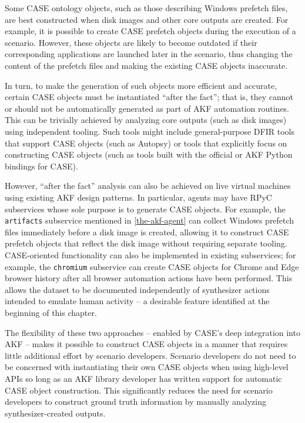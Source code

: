 \documentclass[letterpaper,12pt]{report}
\newcommand{\passthrough}[1]{#1}
\begin{document}
Some CASE ontology objects, such as those describing Windows prefetch
files, are best constructed when disk images and other core outputs are
created. For example, it is possible to create CASE prefetch objects
during the execution of a scenario. However, these objects are likely to
become outdated if their corresponding applications are launched later
in the scenario, thus changing the content of the prefetch files and
making the existing CASE objects inaccurate.

In turn, to make the generation of such objects more efficient and
accurate, certain CASE objects must be instantiated ``after the fact'';
that is, they cannot or should not be automatically generated as part of
AKF automation routines. This can be trivially achieved by analyzing
core outputs (such as disk images) using independent tooling. Such tools
might include general-purpose DFIR tools that support CASE objects (such
as Autopsy) or tools that explicitly focus on constructing CASE objects
(such as tools built with the official or AKF Python bindings for CASE).

However, ``after the fact'' analysis can also be achieved on live
virtual machines using existing AKF design patterns. In particular,
agents may have RPyC subservices whose sole purpose is to generate CASE
objects. For example, the \passthrough{\lstinline!artifacts!} subservice
mentioned in \autoref{the-akf-agent}
can collect Windows prefetch files immediately before a disk image is
created, allowing it to construct CASE prefetch objects that reflect the
disk image without requiring separate tooling. CASE-oriented
functionality can also be implemented in existing subservices; for
example, the \passthrough{\lstinline!chromium!} subservice can create
CASE objects for Chrome and Edge browser history after all browser
automation actions have been performed. This allows the dataset to be
documented independently of synthesizer actions intended to emulate
human activity -- a desirable feature identified at the beginning of
this chapter.

The flexibility of these two approaches -- enabled by CASE's deep
integration into AKF -- makes it possible to construct CASE objects in a
manner that requires little additional effort by scenario developers.
Scenario developers do not need to be concerned with instantiating their
own CASE objects when using high-level APIs so long as an AKF library
developer has written support for automatic CASE object construction.
This significantly reduces the need for scenario developers to construct
ground truth information by manually analyzing synthesizer-created
outputs.
\end{document}
